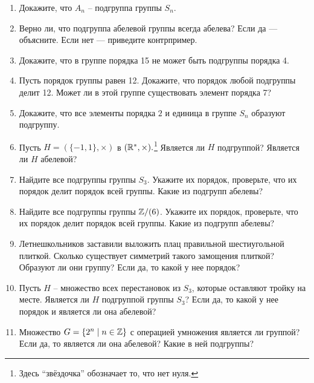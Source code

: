 \begin{enumerate}
    \item Докажите, что $A_n$ -- подгруппа группы $S_n$.
    \item Верно ли, что подгруппа абелевой группы всегда абелева? Если да — объясните. Если нет — приведите контрпример.
    \item Докажите, что в группе порядка 15 не может быть подгруппы порядка 4.
    \item Пусть порядок группы равен 12. Докажите, что порядок любой подгруппы делит 12.
        Может ли в этой группе существовать элемент порядка 7?
    \item Докажите, что все элементы порядка $2$ и единица в группе $S_n$ образуют подгруппу. 
    \item Пусть $H = (\{-1, 1\}, \times)$ в $(\mathbb R^*, \times).$\footnote{
        Здесь ``звёздочка'' обозначает то, что нет нуля.}
        Является ли $H$ подгруппой?
        Является ли $H$ абелевой?
    \item Найдите все подгруппы группы $S_3$. Укажите их порядок, проверьте, что
        их порядок делит порядок всей группы. Какие из подгрупп абелевы?
    \item Найдите все подгруппы группы $\mathbb Z/(6)$. Укажите их порядок, проверьте, что
        их порядок делит порядок всей группы. Какие из подгрупп абелевы?
    \item Летнешкольников заставили выложить плац правильной шестиугольной плиткой. 
        Сколько существует симметрий такого замощения плиткой? Образуют ли они группу?
        Если да, то какой у нее порядок?
    \item Пусть $H$ -- множество всех перестановок из $S_3$, которые оставляют
        тройку на месте. Является ли $H$ подгруппой группы $S_3$?
        Если да, то какой у нее порядок и является ли она абелевой?
    \item Множество $G = \{2^n \mid n \in \mathbb Z\}$ с операцией умножения является ли группой?
        Если да, то является ли она абелевой? Какие в ней подгруппы?
\end{enumerate}
